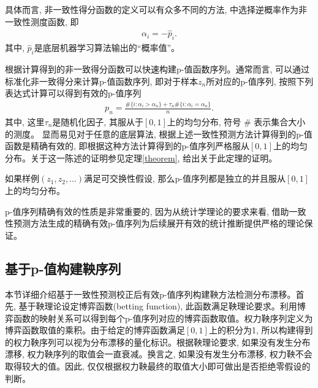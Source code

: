 具体而言, 非一致性得分函数的定义可以有众多不同的方法, 中选择逆概率作为非一致性测度函数\citep{Johansson2017}, 即
\begin{align}
\label{alpha-4.2}
\alpha_{i} = - \hat{p}_{i}.
\end{align}
其中, $\hat{p}_{i}$是底层机器学习算法输出的“概率值”。

根据计算得到的非一致得分函数可以快速构建p-值函数序列\citep{vovk2005algorithmic}。通常而言, 可以通过标准化非一致得分来计算p-值函数序列, 即对于样本$z_n$所对应的p-值序列, 按照下列表达式计算可以得到有效的p-值序列
\begin{align}
\label{alpha-4.3}
p_n = \frac{\#\{i: \alpha_i > \alpha_n\} + \tau_n \# \{i: \alpha_i = \alpha_n\}}{n}.
\end{align}
其中, 这里$\tau_n$是随机化因子, 其服从于$[0, 1]$上的均匀分布, 符号 \# 表示集合大小的测度。 显而易见对于任意的底层算法, 根据上述一致性预测方法计算得到的p-值函数是精确有效的, 即根据这种方法计算得到的p-值序列严格服从$[0,1]$上的均匀分布。关于这一陈述的证明参见定理\ref{theorem}, \citet{vovk2005algorithmic}给出关于此定理的证明。

\begin{theorem}
\label{theorem}
如果样例$(z_1,z_2,\ldots)$满足可交换性假设, 那么p-值序列都是独立的并且服从$[0,1]$上的均匀分布。
\end{theorem}
p-值序列精确有效的性质是非常重要的, 因为从统计学理论的要求来看, 借助一致性预测方法生成的精确有效p-值序列为后续展开有效的统计推断提供严格的理论保证。

\subsection{基于p-值构建鞅序列}
\label{sec:aglorithm}
本节详细介绍基于一致性预测校正后有效p-值序列构建鞅方法检测分布漂移。首先, 基于鞅理论设定博弈函数(betting function), 此函数满足鞅理论要求。利用博弈函数的映射关系可以得到每个p-值序列对应的博弈函数取值。权力鞅序列定义为博弈函数取值的乘积。由于给定的博弈函数满足$[0, 1]$上的积分为1, 所以构建得到的权力鞅序列可以视为分布漂移的量化标识。根据鞅理论要求, 如果没有发生分布漂移, 权力鞅序列的取值会一直衰减。换言之, 如果没有发生分布漂移, 权力鞅不会取得较大的值。因此, 仅仅根据权力鞅最终的取值大小即可做出是否拒绝零假设的判断。

